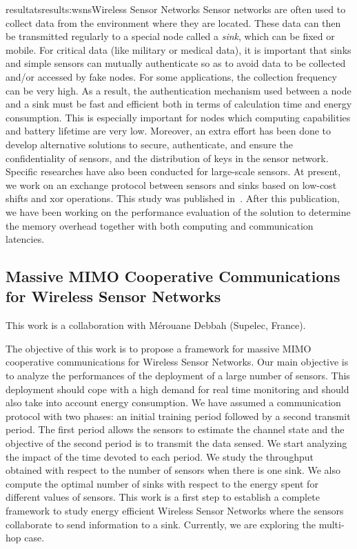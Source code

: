 \documentclass{ra2016}
\begin{document}
\begin{module}{resultats}{results:wsns}{Wireless Sensor Networks}
Sensor networks are often used to collect data from the environment where they are located. These data can then be transmitted regularly to a special node called a {\em sink}, which can be fixed or mobile. For critical data (like military or medical data), it is important that sinks and simple sensors can mutually authenticate so as to avoid data to be collected and/or accessed by fake nodes.
For some applications, the collection frequency can be very high. As a result, the authentication mechanism used between a node and a sink must be fast and efficient both in terms of calculation time and energy consumption. This is especially important for nodes which computing capabilities and battery lifetime are very low. Moreover, an extra effort has been done to develop alternative solutions to secure, authenticate, and ensure the confidentiality of sensors, and the distribution of keys in the sensor network. Specific researches have also been conducted for large-scale sensors. At present, we work on an exchange protocol between sensors and sinks based on low-cost shifts and xor operations. This study was published in~\cite{boumerdassi:hal-01251917}. After this publication, we have been working on the performance evaluation of the solution to determine the memory overhead together with both computing and communication latencies.

\subsection{Massive MIMO Cooperative Communications for Wireless Sensor Networks}

\begin{participants}
\end{participants}

This work is a collaboration with M\'erouane Debbah (Supelec, France).

The objective of this work is to propose a framework for massive MIMO cooperative communications for Wireless Sensor Networks. Our main objective is  to analyze the performances of the deployment of a large number of sensors. This deployment should cope with a high demand for real time monitoring and should also take into account energy consumption. We have assumed a communication protocol with two phases: an initial training period followed by a second transmit period. The first period allows the sensors to estimate the channel state and the objective of the second period is to transmit the data sensed. We start analyzing the impact of the time devoted to each period. We study the throughput obtained with respect to the number of sensors when there is one sink. We also compute the optimal number of sinks with respect to the energy spent for different values of sensors. This work is a first step to establish a complete framework to study energy efficient Wireless Sensor Networks where the sensors collaborate to send information to a sink. Currently, we are exploring the multi-hop case.

\end{module}
\end{document}
